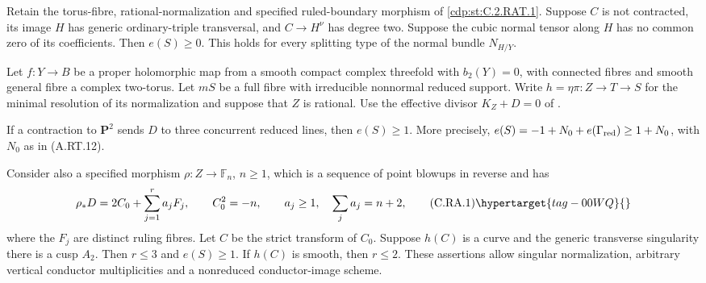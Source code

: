 
\begin{proposition}\hypertarget{tag-01CJ}{}\label{cdp:st:C.2.RAT.7}


Retain the torus-fibre, rational-normalization and specified
ruled-boundary morphism of \ref{cdp:st:C.2.RAT.1}. Suppose $C$ is not
contracted, its image $H$ has generic ordinary-triple
transversal, and $C\to H^\nu$ has degree two. Suppose
the cubic normal tensor along $H$ has no common zero of
its coefficients. Then $e(S)\ge0$. This holds for every
splitting type of the normal bundle $N_{H/Y}$.
\end{proposition}

\begin{proposition}\hypertarget{tag-01CD}{}\label{cdp:st:C.2.RAT.1}


Let $f:Y\to B$ be a proper holomorphic map from a smooth compact
complex threefold with $b_2(Y)=0$, with connected fibres and smooth
general fibre a complex two-torus. Let $mS$ be a full fibre with
irreducible nonnormal reduced support. Write
$h=\eta\pi:Z\to T\to S$ for the minimal resolution of its
normalization and suppose that $Z$ is rational. Use the effective
divisor $K_Z+D=0$ of .

If a contraction to $\mathbf P^2$ sends $D$ to three concurrent
reduced lines, then $e(S)\ge1$. More precisely,
$e(S)=-1+N_0+e(\Gamma_{\rm red})\ge1+N_0$, with $N_0$ as in
(A.RT.12).

Consider also a specified morphism $\rho:Z\to\mathbb F_n$,
$n\ge1$, which is a sequence of point blowups in reverse and has
\[
 \rho_*D=2C_0+\sum_{j=1}^r a_jF_j,\qquad
 C_0^2=-n,\qquad
 a_j\ge1,\quad \sum_j a_j=n+2,                  \tag{C.RA.1}\hypertarget{tag-00WQ}{}\label{cdp:eq:C.RA.1}
\]
where the $F_j$ are distinct ruling fibres. Let $C$ be the
strict transform of $C_0$. Suppose $h(C)$ is a curve and the
generic transverse singularity there is a cusp $A_2$.
Then $r\le3$ and $e(S)\ge1$. If $h(C)$ is smooth, then
$r\le2$. These assertions allow singular normalization,
arbitrary vertical conductor multiplicities and a nonreduced
conductor-image scheme.
\end{proposition}

